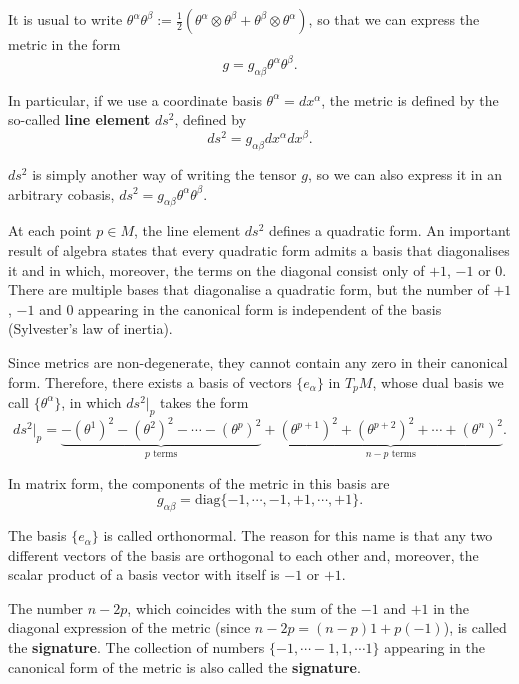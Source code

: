 \begin{points}
\item It is usual to write $\theta^\alpha\theta^\beta:=\frac12\left(\theta^\alpha\otimes\theta^\beta+\theta^\beta\otimes\theta^\alpha\right)$, so that we can express the metric in the form
\[
  g=g_{\alpha\beta}\theta^\alpha\theta^\beta .
\]

\item In particular, if we use a coordinate basis $\theta^\alpha=dx^\alpha$, the metric is defined by the so-called \textbf{line element} $ds^2$, defined by
\[
  ds^2=g_{\alpha\beta}dx^\alpha dx^\beta .
\]

\item $ds^2$ is simply another way of writing the tensor $g$, so we can also express it in an arbitrary cobasis, $ds^2=g_{\alpha\beta}\theta^\alpha\theta^\beta$.

\item At each point $p\in M$, the line element $ds^2$ defines a quadratic form. An important result of algebra states that every quadratic form admits a basis that diagonalises it and in which, moreover, the terms on the diagonal consist only of $+1$, $-1$ or $0$. There are multiple bases that diagonalise a quadratic form, but the number of $+1$, $-1$ and $0$ appearing in the canonical form is independent of the basis (Sylvester's law of inertia).

\item Since metrics are non-degenerate, they cannot contain any zero in their canonical form. Therefore, there exists a basis of vectors $\{e_\alpha\}$ in $T_pM$, whose dual basis we call $\{\theta^\alpha\}$, in which $ds^2|_p$ takes the form
\[
  ds^2|_p=\underbrace{-(\theta^1)^2-(\theta^2)^2-\cdots-(\theta^{p})^2}_{p\text{ terms}}+\underbrace{(\theta^{p+1})^2+(\theta^{p+2})^2+\cdots+(\theta^n)^2}_{n-p\text{ terms}} .
\]

\item In matrix form, the components of the metric in this basis are
\[
  g_{\alpha\beta}=\mathrm{diag}\{-1,\cdots,-1,+1,\cdots,+1\}.
\]

\item The basis $\{e_\alpha\}$ is called orthonormal. The reason for this name is that any two different vectors of the basis are orthogonal to each other and, moreover, the scalar product of a basis vector with itself is $-1$ or $+1$.

\item The number $n-2p$, which coincides with the sum of the $-1$ and $+1$ in the diagonal expression of the metric (since $n-2p=(n-p)1+p(-1)$), is called the \textbf{signature}. The collection of numbers $\{-1,\cdots-1,1,\cdots1\}$ appearing in the canonical form of the metric is also called the \textbf{signature}.


\end{points}
